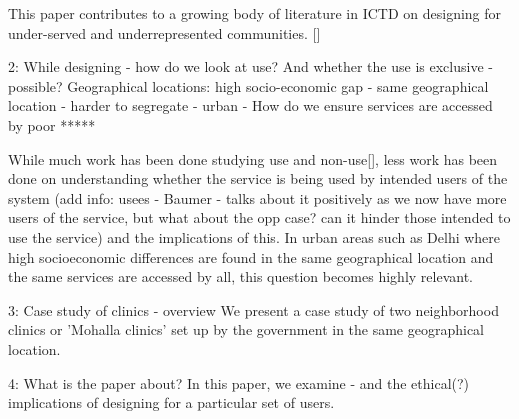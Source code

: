 This paper contributes to a growing body of literature in ICTD on designing for under-served and underrepresented communities. []

2: While designing - how do we look at use? And whether the use is exclusive - possible? 
Geographical locations: high socio-economic gap - same geographical location - harder to segregate - urban - How do we ensure services are accessed by poor
*****

While much work has been done studying use and non-use[], less work has been done on understanding whether the service is being used by intended users of the system (add info: usees - Baumer - talks about it positively as we now have more users of the service, but what about the opp case? can it hinder those intended to use the service) and the implications of this. In urban areas such as Delhi where high socioeconomic differences are found in the same geographical location and the same services are accessed by all, this question becomes highly relevant.

3: Case study of clinics - overview
We present a case study of two neighborhood clinics or 'Mohalla clinics' set up by the government in the same geographical location. 

4: What is the paper about?
In this paper, we examine - and the ethical(?) implications of designing for a particular set of users.
